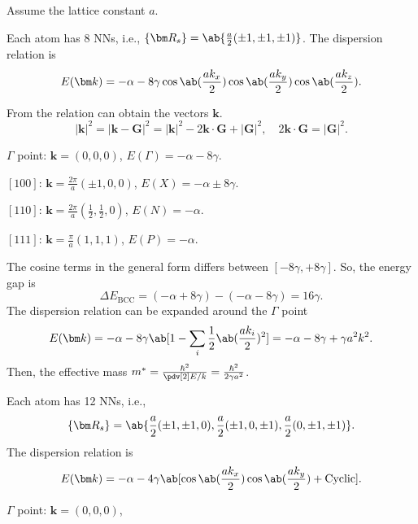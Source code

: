 \begin{solution}[$\text{i} = \text{BCC}$, $\text{ii} = \text{FCC}$]
  Assume the lattice constant $a$.
   \setcounter{case}{1}
  \begin{enumext}[label = (\alph*\textsubscript{\roman{case}})]
    \item Each atom has 8 NNs, i.e.,
    $\{\bm R_s\} = \ab\{\frac a2(\pm1, \pm1, \pm1)\}$.
    The dispersion relation is
    \[
      E(\bm k) = -\alpha - 8\gamma
      \cos\ab(\frac{ak_x}2) \cos\ab(\frac{ak_y}2) \cos\ab(\frac{ak_z}2).
    \]
    \item From the relation can obtain the vectors $\bm k$.
    \[
      |\bm k|^2 = |\bm k - \bm G|^2
    = |\bm k|^2 - 2\bm k \cdot \bm G + |\bm G|^2, \quad
      2\bm k \cdot \bm G = |\bm G|^2.
    \]
    \begin{enumext}
      \item $\Gamma$ point: $\bm k = (0,0,0)$,
      $E(\Gamma) = -\alpha - 8\gamma$.
      \item $[100]$: $\bm k = \frac{2\pi}{a}(\pm 1, 0, 0)$,
      $E(X) = -\alpha \pm 8\gamma$.
      \item $[110]$: $\bm k = \frac{2\pi}{a}(\frac12, \frac12, 0)$,
      $E(N) = -\alpha$.
      \item $[111]$: $\bm k = \frac\pi a(1, 1, 1)$,
      $E(P) = -\alpha$.
    \end{enumext}
    \item The cosine terms in the general form differs between
    $[-8\gamma, +8\gamma]$. So, the energy gap is
    \[
      \Delta E_\text{BCC} = (-\alpha + 8\gamma) - (-\alpha - 8\gamma)
    = 16\gamma.
    \]
    The dispersion relation can be expanded around the $\Gamma$ point
    \[
      E(\bm k) = -\alpha - 8\gamma
        \ab[1- \sum_i \frac12\ab(\frac{ak_i}{2})^2]
    = -\alpha - 8\gamma + \gamma a^2 k^2.
    \]
    Then, the effective mass $m^* = \frac{\hbar^2}{\pdv[2]E/k}
    = \frac{\hbar^2}{2\gamma a^2}$.
    \addtocounter{case}{1} \setcounter{enumXi}{0}
    \item Each atom has 12 NNs, i.e.,
    \[
      \{\bm R_s\} = \ab\{
        \frac a2(\pm1, \pm1, 0),
        \frac a2(\pm1, 0, \pm1),
        \frac a2(0, \pm1, \pm1)\}.
    \]
    The dispersion relation is
    \[
      E(\bm k) = -\alpha - 4\gamma
        \ab[\cos\ab(\frac{ak_x}2) \cos\ab(\frac{ak_y}2) + \text{Cyclic}].
    \]
    \item \begin{enumext}
      \item $\Gamma$ point: $\bm k = (0,0,0)$,

\end{enumext}
\end{enumext}
\end{solution}
